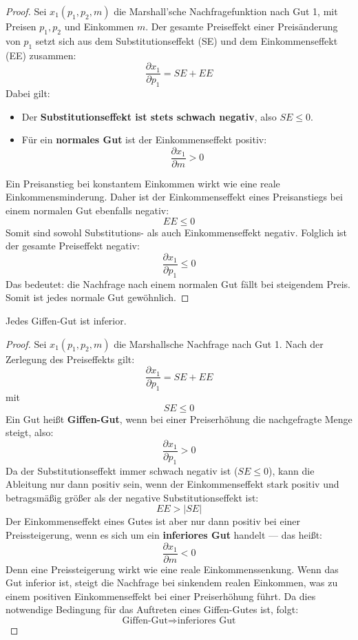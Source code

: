 \begin{proof}
	Sei \( x_1(p_1, p_2, m) \) die Marshall'sche Nachfragefunktion nach Gut 1, mit Preisen \( p_1, p_2 \) und Einkommen \( m \).
	Der gesamte Preiseffekt einer Preisänderung von \( p_1 \) setzt sich aus dem Substitutionseffekt (SE) und dem Einkommenseffekt (EE) zusammen:
	\[
		\frac{\partial x_1}{\partial p_1} = SE + EE
	\]
	Dabei gilt:
	\begin{itemize}
		\item Der \textbf{Substitutionseffekt ist stets schwach negativ}, also \( SE \leq 0 \).
		\item Für ein \textbf{normales Gut} ist der Einkommenseffekt positiv:
		      \[
			      \frac{\partial x_1}{\partial m} > 0
		      \]
	\end{itemize}
	Ein Preisanstieg bei konstantem Einkommen wirkt wie eine reale Einkommensminderung. Daher ist der Einkommenseffekt eines Preisanstiegs bei einem normalen Gut ebenfalls negativ:
	\[
		EE \leq 0
	\]
	Somit sind sowohl Substitutions- als auch Einkommenseffekt negativ.
	Folglich ist der gesamte Preiseffekt negativ:
	\[
		\frac{\partial x_1}{\partial p_1} \leq 0
	\]
	Das bedeutet: die Nachfrage nach einem normalen Gut fällt bei steigendem Preis. Somit ist jedes normale Gut gewöhnlich.
\end{proof}
\begin{corollary}
	Jedes Giffen-Gut ist inferior. \label{cor:giffen}
\end{corollary}

\begin{proof}
	Sei \( x_1(p_1, p_2, m) \) die Marshallsche Nachfrage nach Gut 1.
	Nach der Zerlegung des Preiseffekts gilt:
	\[
		\frac{\partial x_1}{\partial p_1} = SE + EE
	\]
	mit
	\[
		SE \leq 0
	\]
	Ein Gut heißt \textbf{Giffen-Gut}, wenn bei einer Preiserhöhung die nachgefragte Menge steigt, also:
	\[
		\frac{\partial x_1}{\partial p_1} > 0
	\]
	Da der Substitutionseffekt immer schwach negativ ist (\( SE \leq 0 \)), kann die Ableitung nur dann positiv sein, wenn der Einkommenseffekt stark positiv und betragsmäßig größer als der negative Substitutionseffekt ist:
	\[
		EE > |SE|
	\]
	Der Einkommenseffekt eines Gutes ist aber nur dann positiv bei einer Preissteigerung, wenn es sich um ein \textbf{inferiores Gut} handelt — das heißt:
	\[
		\frac{\partial x_1}{\partial m} < 0
	\]
	Denn eine Preissteigerung wirkt wie eine reale Einkommenssenkung. Wenn das Gut inferior ist, steigt die Nachfrage bei sinkendem realen Einkommen, was zu einem positiven Einkommenseffekt bei einer Preiserhöhung führt.
	Da dies notwendige Bedingung für das Auftreten eines Giffen-Gutes ist, folgt:
	\[
		\text{Giffen-Gut} \Rightarrow \text{inferiores Gut}
	\]
\end{proof}

